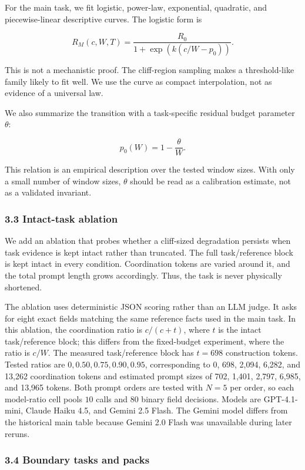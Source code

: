 \documentclass[
  runningheads]{llncs}
\begin{document}
For the main task, we fit logistic, power-law, exponential, quadratic,
and piecewise-linear descriptive curves. The logistic form is

\[
R_M(c,W,T)=\frac{R_0}{1+\exp(k(c/W-p_0))}.
\]

This is not a mechanistic proof. The cliff-region sampling makes a
threshold-like family likely to fit well. We use the curve as compact
interpolation, not as evidence of a universal law.

We also summarize the transition with a task-specific residual budget
parameter \(\theta\):

\[
p_0(W)=1-\frac{\theta}{W}.
\]

This relation is an empirical description over the tested window sizes.
With only a small number of window sizes, \(\theta\) should be read as a
calibration estimate, not as a validated invariant.

\subsubsection{3.3 Intact-task ablation}\label{intact-task-ablation}

We add an ablation that probes whether a cliff-sized degradation
persists when task evidence is kept intact rather than truncated. The
full task/reference block is kept intact in every condition.
Coordination tokens are varied around it, and the total prompt length
grows accordingly. Thus, the task is never physically shortened.

The ablation uses deterministic JSON scoring rather than an LLM judge.
It asks for eight exact fields matching the same reference facts used in
the main task. In this ablation, the coordination ratio is \(c/(c+t)\),
where \(t\) is the intact task/reference block; this differs from the
fixed-budget experiment, where the ratio is \(c/W\). The measured
task/reference block has \(t=698\) construction tokens. Tested ratios
are \(0, 0.50, 0.75, 0.90, 0.95\), corresponding to 0, 698, 2,094,
6,282, and 13,262 coordination tokens and estimated prompt sizes of 702,
1,401, 2,797, 6,985, and 13,965 tokens. Both prompt orders are tested
with \(N=5\) per order, so each model-ratio cell pools \(10\) calls and
\(80\) binary field decisions. Models are GPT-4.1-mini, Claude Haiku
4.5, and Gemini 2.5 Flash. The Gemini model differs from the historical
main table because Gemini 2.0 Flash was unavailable during later reruns.

\subsubsection{3.4 Boundary tasks and
packs}\label{boundary-tasks-and-packs}
\end{document}
